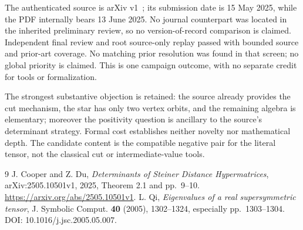 \documentclass[11pt]{article}
\begin{document}
The authenticated source is arXiv v1~\cite{CD}; its submission date is 15 May 2025, while the PDF internally bears 13 June 2025. No journal counterpart was located in the inherited preliminary review, so no version-of-record comparison is claimed. Independent final review and root source-only replay passed with bounded source and prior-art coverage. No matching prior resolution was found in that screen; no global priority is claimed. This is one campaign outcome, with no separate credit for tools or formalization.

The strongest substantive objection is retained: the source already provides the cut mechanism, the star has only two vertex orbits, and the remaining algebra is elementary; moreover the positivity question is ancillary to the source's determinant strategy. Formal cost establishes neither novelty nor mathematical depth. The candidate content is the compatible negative pair for the literal tensor, not the classical cut or intermediate-value tools.

\begin{thebibliography}{9}
 J. Cooper and Z. Du, \emph{Determinants of Steiner Distance Hypermatrices}, arXiv:2505.10501v1, 2025, Theorem 2.1 and pp.~9--10. \url{https://arxiv.org/abs/2505.10501v1}.
 L. Qi, \emph{Eigenvalues of a real supersymmetric tensor}, J. Symbolic Comput. \textbf{40} (2005), 1302--1324, especially pp.~1303--1304. DOI: 10.1016/j.jsc.2005.05.007.
\end{thebibliography}
\end{document}
